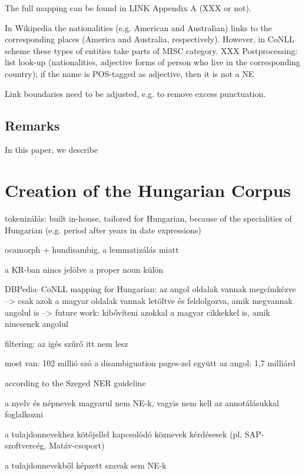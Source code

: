 \documentclass[11pt]{article}
\begin{document}
The full mapping can be found in LINK Appendix A (XXX or not).

In Wikipedia the nationalities (e.g. American and Australian) links to the corresponding places (America and Australia, respectively). However, in CoNLL scheme these types of entities take parts of MISC category. XXX Postprocessing: list look-up (nationalities, adjective forms of person who live in the corresponding country); if the name is POS-tagged as adjective, then it is not a NE

Link boundaries need to be adjusted, e.g. to remove excess punctuation.

\subsection{Remarks}

In this paper, we describe %

\section{Creation of the Hungarian Corpus}

tokenizálás: built in-house, tailored for Hungarian, because of the specialities of Hungarian (e.g. period after years in date expressions)

ocamorph + hundisambig, a lemmatizálás miatt

a KR-ban nincs jelölve a proper noun külön

DBPedia--CoNLL mapping for Hungarian: az angol oldalak vannak megcímkézve --> csak azok a magyar oldalak vannak letöltve és feldolgozva, amik megvannak angolul is
	--> future work: kibővíteni azokkal a magyar cikkekkel is, amik nincsenek angolul

filtering: az igés szűrő itt nem lesz

most van: 102 millió szó a disambiguation pages-zel együtt
az angol: 1,7 milliárd

according to the Szeged NER guideline

a nyelv és népnevek magyarul nem NE-k, vagyis nem kell az annotálásukkal foglalkozni

a tulajdonnevekhez kötőjellel kapcsolódó köznevek kérdésesek (pl. SAP-szoftvercég, Matáv-csoport)

a tulajdonnevekből képzett szavak sem NE-k

\end{document}
